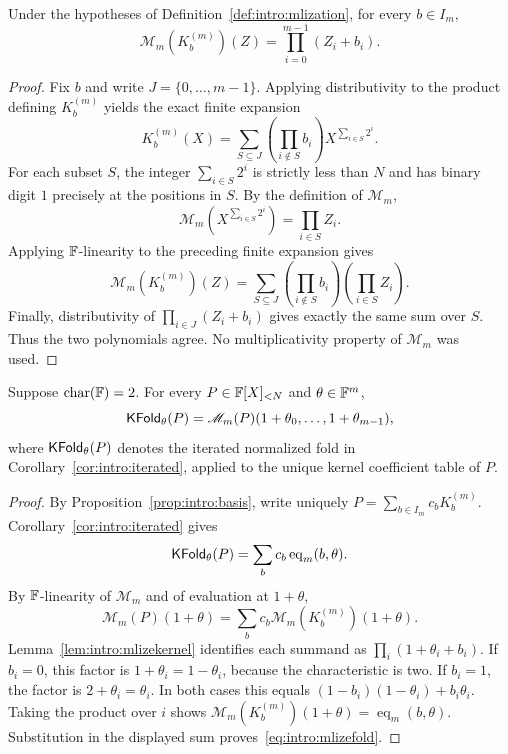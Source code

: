 \begin{lemma}\label{lem:intro:mlizekernel}
Under the hypotheses of Definition~\ref{def:intro:mlization}, for every $b\in I_m$,
\[
 \mathscr M_m(K_b^{(m)})(Z)=\prod_{i=0}^{m-1}(Z_i+b_i).
\]
\end{lemma}
\begin{proof}
Fix $b$ and write $J=\{0,\ldots,m-1\}$. Applying distributivity to the product defining $K_b^{(m)}$ yields the exact finite expansion
\[
 K_b^{(m)}(X)=\sum_{S\subseteq J}\left(\prod_{i\notin S}b_i\right)X^{\sum_{i\in S}2^i}.
\]
For each subset $S$, the integer $\sum_{i\in S}2^i$ is strictly less than $N$ and has binary digit $1$ precisely at the positions in $S$. By the definition of $\mathscr M_m$,
\[
 \mathscr M_m\left(X^{\sum_{i\in S}2^i}\right)=\prod_{i\in S}Z_i.
\]
Applying $\mathbb{F}$-linearity to the preceding finite expansion gives
\[
 \mathscr M_m(K_b^{(m)})(Z)=\sum_{S\subseteq J}\left(\prod_{i\notin S}b_i\right)\left(\prod_{i\in S}Z_i\right).
\]
Finally, distributivity of $\prod_{i\in J}(Z_i+b_i)$ gives exactly the same sum over $S$. Thus the two polynomials agree. No multiplicativity property of $\mathscr M_m$ was used.
\end{proof}

\begin{proposition}\label{prop:intro:mlizefold}
Suppose $\operatorname{char}(\mathbb{F})=2$. For every $P\in\mathbb{F}[X]_{<N}$ and $\theta\in\mathbb{F}^m$,
\begin{equation}\label{eq:intro:mlizefold}
 \mathsf{KFold}_\theta(P)=\mathscr M_m(P)(1+\theta_0,\ldots,1+\theta_{m-1}),
\end{equation}
where $\mathsf{KFold}_\theta(P)$ denotes the iterated normalized fold in Corollary~\ref{cor:intro:iterated}, applied to the unique kernel coefficient table of $P$.
\end{proposition}
\begin{proof}
By Proposition~\ref{prop:intro:basis}, write uniquely $P=\sum_{b\in I_m}c_bK_b^{(m)}$. Corollary~\ref{cor:intro:iterated} gives
\[
 \mathsf{KFold}_\theta(P)=\sum_b c_b\operatorname{eq}_m(b,\theta).
\]
By $\mathbb{F}$-linearity of $\mathscr M_m$ and of evaluation at $1+\theta$,
\[
 \mathscr M_m(P)(1+\theta)=\sum_b c_b\mathscr M_m(K_b^{(m)})(1+\theta).
\]
Lemma~\ref{lem:intro:mlizekernel} identifies each summand as $\prod_i(1+\theta_i+b_i)$. If $b_i=0$, this factor is $1+\theta_i=1-\theta_i$, because the characteristic is two. If $b_i=1$, the factor is $2+\theta_i=\theta_i$. In both cases this equals $(1-b_i)(1-\theta_i)+b_i\theta_i$. Taking the product over $i$ shows $\mathscr M_m(K_b^{(m)})(1+\theta)=\operatorname{eq}_m(b,\theta)$. Substitution in the displayed sum proves~\eqref{eq:intro:mlizefold}.
\end{proof}
